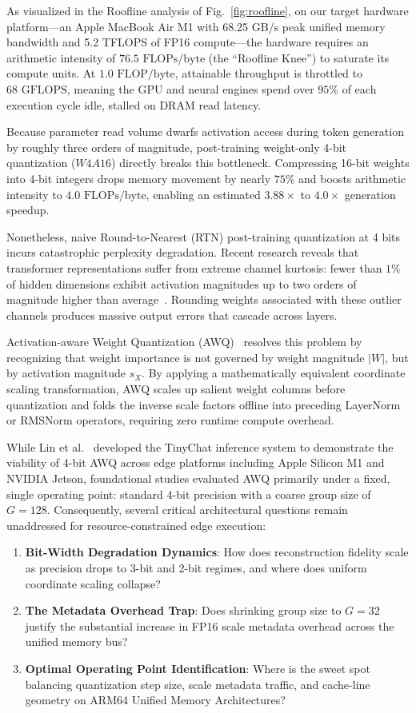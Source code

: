 \documentclass[conference]{IEEEtran}
\begin{document}
As visualized in the Roofline analysis of Fig.~\ref{fig:roofline}, on our target hardware platform---an Apple MacBook Air M1 with 68.25 GB/s peak unified memory bandwidth and 5.2 TFLOPS of FP16 compute---the hardware requires an arithmetic intensity of $76.5\text{ FLOPs/byte}$ (the ``Roofline Knee'') to saturate its compute units. At $1.0\text{ FLOP/byte}$, attainable throughput is throttled to $68\text{ GFLOPS}$, meaning the GPU and neural engines spend over $95\%$ of each execution cycle idle, stalled on DRAM read latency.

Because parameter read volume dwarfs activation access during token generation by roughly three orders of magnitude, post-training weight-only 4-bit quantization ($W4A16$) directly breaks this bottleneck. Compressing 16-bit weights into 4-bit integers drops memory movement by nearly $75\%$ and boosts arithmetic intensity to $4.0\text{ FLOPs/byte}$, enabling an estimated $3.88\times$ to $4.0\times$ generation speedup.

Nonetheless, naive Round-to-Nearest (RTN) post-training quantization at 4 bits incurs catastrophic perplexity degradation. Recent research reveals that transformer representations suffer from extreme channel kurtosis: fewer than $1\%$ of hidden dimensions exhibit activation magnitudes up to two orders of magnitude higher than average~\cite{dettmers2022llmint8, xiao2023smoothquant}. Rounding weights associated with these outlier channels produces massive output errors that cascade across layers.

Activation-aware Weight Quantization (AWQ)~\cite{lin2024awq} resolves this problem by recognizing that weight importance is not governed by weight magnitude $|W|$, but by activation magnitude $s_X$. By applying a mathematically equivalent coordinate scaling transformation, AWQ scales up salient weight columns before quantization and folds the inverse scale factors offline into preceding LayerNorm or RMSNorm operators, requiring zero runtime compute overhead.

While Lin et al.~\cite{lin2024awq} developed the TinyChat inference system to demonstrate the viability of 4-bit AWQ across edge platforms including Apple Silicon M1 and NVIDIA Jetson, foundational studies evaluated AWQ primarily under a fixed, single operating point: standard 4-bit precision with a coarse group size of $G=128$. Consequently, several critical architectural questions remain unaddressed for resource-constrained edge execution:
\begin{enumerate}
    \item \textbf{Bit-Width Degradation Dynamics}: How does reconstruction fidelity scale as precision drops to 3-bit and 2-bit regimes, and where does uniform coordinate scaling collapse?
    \item \textbf{The Metadata Overhead Trap}: Does shrinking group size to $G=32$ justify the substantial increase in FP16 scale metadata overhead across the unified memory bus?
    \item \textbf{Optimal Operating Point Identification}: Where is the sweet spot balancing quantization step size, scale metadata traffic, and cache-line geometry on ARM64 Unified Memory Architectures?
\end{enumerate}
\end{document}
